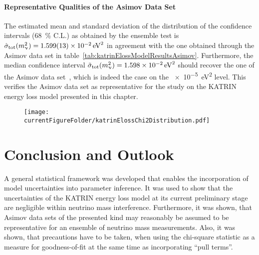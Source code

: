 \paragraph{Representative Qualities of the Asimov Data Set}
The estimated mean and standard deviation of the distribution of the  confidence intervals (\SI{68}{\percent} C.L.) as obtained by the ensemble test is $\hat{\sigma}_\mathrm{tot}(\nuMass^2)=\SI{1.599\pm0.013e-2}{eV^2}$ in agreement with the one obtained through the Asimov data set in table~\ref{tab:katrinElossModelResultsAsimov}. Furthermore, the median confidence interval $\tilde{\sigma}_\mathrm{tot}(\nuMass^2)=\SI{1.598e-2}{eV^2}$ should recover the one of the Asimov data set~\cite{Cowan2011}, which is indeed the case on the \SI{e-5}{eV^2} level. This verifies the Asimov data set as representative for the study on the KATRIN energy loss model presented in this chapter.

\begin{figure}[t]
	\centering
	\texttt{[image: \\currentFigureFolder/katrinElossChi2Distribution.pdf]}
	\label{fig:katrinElossStatisticsChi2}
\end{figure}
\FloatBarrier
\section{Conclusion and Outlook}
\label{sec:katrinElossModelOutlook}
A general statistical framework was developed that enables the incorporation of model uncertainties into parameter inference. It was used to show that the uncertainties of the KATRIN energy loss model at its current preliminary stage are negligible within neutrino mass interference. Furthermore, it was shown, that Asimov data sets of the presented kind may reasonably be assumed to be representative for an ensemble of neutrino mass measurements. Also, it was shown, that precautions have to be taken, when using the chi-square statistic as a measure for goodness-of-fit at the same time as incorporating ``pull terms''. 

